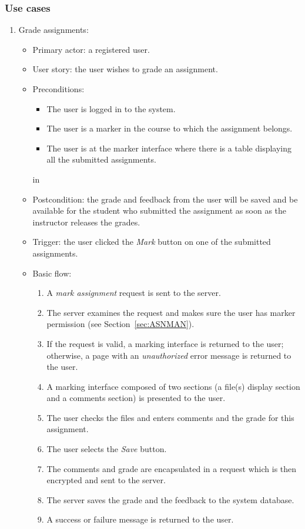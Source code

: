 \subsubsection{Use cases}
\begin{enumerate}
\item Grade assignments:
\begin{itemize}
    \item Primary actor: a registered user.
    \item User story: the user wishes to grade an assignment.
    \item Preconditions:
        \begin{itemize}
            \item The user is logged in to the system.
            \item The user is a marker in the course
                to which the assignment belongs.
            \item The user is at the marker interface where there
                is a table displaying all the submitted assignments.
        \end{itemize}
     in
    \item Postcondition:
            the grade and feedback from the user will be saved and be
            available for the student who submitted the assignment as soon
            as the instructor releases the grades.
    \item Trigger:
        the user clicked the \emph{Mark} button on one of the submitted
        assignments.
    \item Basic flow:
        \begin{enumerate}
            \item A \emph{mark assignment} request is sent to the server.
            \item The server examines the request and makes sure the user has
                marker permission (see Section~\ref{sec:ASNMAN}).
            \item If the request is valid, a marking interface is returned to
                the user; otherwise, a page with an \emph{unauthorized} error
                message is returned to the user.
            \item A marking interface composed of two sections
                (a file(s) display section and a comments section)
                is presented to the user.
            \item The user checks the files and enters comments and the
                grade for this assignment.
            \item The user selects the \emph{Save} button.
            \item The comments and grade are encapsulated in a request which
                is then encrypted and sent to the server.
            \item The server saves the grade and the feedback to the system
                database.
            \item A success or failure message is returned to the user.
        \end{enumerate}
\end{itemize}
\end{enumerate}


